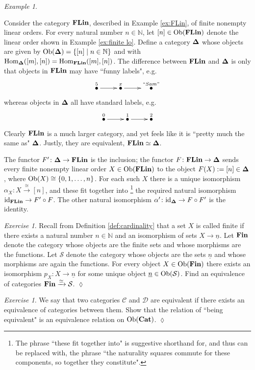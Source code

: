 \documentclass{book}
\def\tn{\textnormal}
\def\mc{\mathcal}
\def\NN{{\mathbb N}}
\def\Hom{\tn{Hom}}
\def\Ob{\tn{Ob}}
\def\to{\rightarrow}
\def\taking{\colon}
\def\iso{\cong}
\def\|{{\;|\;}}
\def\ul{\underline}
\newcommand{\LMO}[1]{\stackrel{#1}{\bullet}}
\newcommand{\To}[1]{\xrightarrow{#1}}
\def\id{\tn{id}}
\def\Cat{{\bf Cat}}
\def\FLin{{\bf FLin}}
\def\bD{{\bf \Delta}}
\def\mcC{\mc{C}}
\def\mcD{\mc{D}}
\def\mcS{\mc{S}}
\theoremstyle{remark}
\newtheorem{example}[subsubsection]{Example}
\newtheorem{exc}[subsubsection]{Exercise}
\newenvironment{exercise}{\begin{exc}}{\hspace*{\fill}$\lozenge$\end{exc}}
\theoremstyle{definition}
\def\Fin{{\bf Fin}}
\begin{document}
\begin{example}\label{ex:finite linear orders}

Consider the category $\FLin$, described in Example \ref{ex:FLin}, of finite nonempty linear orders. For every natural number $n\in\NN$, let $[n]\in\Ob(\FLin)$ denote the linear order shown in Example \ref{ex:finite lo}. Define a category $\bD$\index{a category!$\bD$} whose objects are given by $\Ob(\bD)=\{[n]\|n\in\NN\}$ and with $\Hom_{\bD}([m],[n])=\Hom_{\FLin}([m],[n])$. The difference between $\FLin$ and $\bD$ is only that objects in $\FLin$ may have ``funny labels", e.g. 
$$\xymatrix{\LMO{5}\ar[r]&\LMO{x}\ar[r]&\LMO{``Sam"}}$$ 
whereas objects in $\bD$ all have standard labels, e.g.
$$\xymatrix{\LMO{0}\ar[r]&\LMO{1}\ar[r]&\LMO{2}}$$
Clearly $\FLin$ is a much larger category, and yet feels like it is ``pretty much the same as" $\bD$. Justly, they are equivalent, $\FLin\simeq\bD$. 

The functor $F'\taking\bD\to\FLin$\index{a functor!$\bD\to\FLin$} is the inclusion; the functor $F\taking\FLin\to\bD$ sends every finite nonempty linear order $X\in\Ob(\FLin)$ to the object $F(X):=[n]\in\bD$, where $\Ob(X)\iso\{0,1,\ldots,n\}$. For each such $X$ there is a unique isomorphism $\alpha_X\taking X\To{\iso}[n]$, and these fit together into
\footnote{The phrase ``these fit together into" is suggestive shorthand for, and thus can be replaced with, the phrase ``the naturality squares commute for these components, so together they constitute".}
the required natural isomorphism $\id_{\FLin}\to F'\circ F$. The other natural isomorphism $\alpha'\taking\id_{\bD}\to F\circ F'$ is the identity.

\end{example}

\begin{exercise}
Recall from Definition \ref{def:cardinality} that a set $X$ is called finite if there exists a natural number $n\in\NN$ and an isomorphism of sets $X\to\ul{n}$. Let $\Fin$\index{a category!$\Fin$} denote the category whose objects are the finite sets and whose morphisms are the functions. Let $\mcS$ denote the category whose objects are the sets $\ul{n}$ and whose morphisms are again the functions. For every object $X\in\Ob(\Fin)$ there exists an isomorphism $p_X\taking X\to\ul{n}$ for some unique object $\ul{n}\in\Ob(\mcS)$. Find an equivalence of categories $\Fin\To{\simeq}\mcS$. 
\end{exercise}

\begin{exercise}
We say that two categories $\mcC$ and $\mcD$ are equivalent if there exists an equivalence of categories between them. Show that the relation of ``being equivalent" is an equivalence relation on $\Ob(\Cat)$.
\end{exercise}
\end{document}
